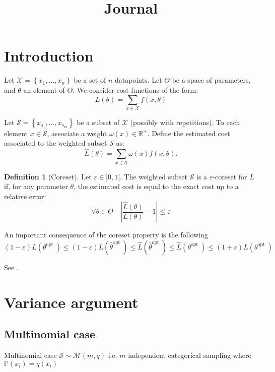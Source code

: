 \documentclass{article}
\title{Journal}
\renewcommand{\epsilon}{\varepsilon}
\theoremstyle{definition}
\newtheorem{definition}{Definition}[section]
\begin{document}
	
	\maketitle
	
	\section{Introduction}
	
	Let $\mathcal{X}=\left\{x_{1}, \ldots, x_{n}\right\}$ be a set of $n$ datapoints. Let $\Theta$ be a space of parameters, and $\theta$ an element of $\Theta$. We consider cost functions of the form:
	$$
	L(\theta)=\sum_{x \in \mathcal{X}} f(x, \theta)
	$$
	
	Let $\mathcal{S}=\left\{x_{s_{1}}, \ldots, x_{s_{m}}\right\}$ be a subset of $\mathcal{X}$ (possibly with repetitions). To each element $x \in \mathcal{S}$, associate a weight $\omega\left(x\right) \in \mathbb{R}^{+}$. Define the estimated cost associated to the weighted subset $\mathcal{S}$ as:
	$$
	\hat{L}(\theta)=\sum_{x \in \mathcal{S}} \omega\left(x\right) f\left(x, \theta\right) .
	$$
	\begin{definition}[Coreset]
			Let $\epsilon \in {]}0,1{[}$. The weighted subset $\mathcal{S}$ is a $\epsilon$-coreset for $L$ if, for any parameter $\theta$, the estimated cost is equal to the exact cost up to a relative error:
		$$
		\forall \theta \in \Theta \quad\left|\frac{\hat{L}(\theta)}{L(\theta)}-1\right| \le \epsilon 
		$$
	\end{definition}

An important consequence of the coreset property is the following
$$
(1-\epsilon) L\left(\theta^{\text {opt }}\right) \le(1-\epsilon) L\left( \hat{\theta}^{\text {opt }}\right) \le \hat{L}\left( \hat{\theta}^{\text {opt }}\right) \le \hat{L}\left( \theta^{\text {opt }}\right) \le(1+\epsilon) L\left( \theta^{\text {opt }}\right)
$$

See \cite{bachem2017coresetML}.

\section{Variance argument}
\subsection{Multinomial case}
Multinomial case $\mathcal S \sim \mathcal M(m, q)$ i.e. $m$ independent categorical sampling where $\mathbb P(x_i)  = q(x_i)$
\end{document}

